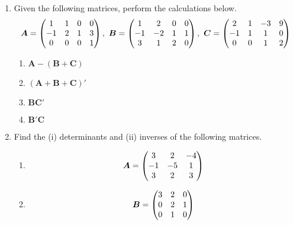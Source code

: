 \documentclass[pdflatex, letterpaper, 12pt]{scrartcl}
\begin{document}
\begin{enumerate}
\item Given the following matrices, perform the calculations below.
\begin{equation}
\bm{A} = \begin{pmatrix}
1 & 1 & 0 & 0 \\
-1 & 2 & 1 & 3 \\
0 & 0 & 0 & 1 \\
\end{pmatrix}, \ 
\bm{B} = \begin{pmatrix}
1 & 2 & 0 & 0 \\
-1 & -2 & 1 & 1 \\
3 & 1 & 2 & 0 \\
\end{pmatrix}, \ 
\bm{C} = \begin{pmatrix}
2 & 1 & -3 & 9 \\
-1 & 1 & 1 & 0 \\
0 & 0 & 1 & 2 \\
\end{pmatrix} \notag
\end{equation}
 \begin{enumerate}[label=(\alph*)]
 \item $\bm{A} - (\bm{B} + \bm{C})$
 \item $(\bm{A} + \bm{B} + \bm{C})'$
 \item $\bm{BC}'$
 \item $\bm{B}'\bm{C}$
 \end{enumerate}

\item Find the (i) determinants and (ii) inverses of the following matrices.
 \begin{enumerate}[label=(\alph*)]
 \item \begin{equation}
 \bm{A} = \begin{pmatrix}
 3 & 2 & -4 \\
 -1 & -5 & 1 \\
 3 & 2 & 3 \\
 \end{pmatrix} \notag
 \end{equation}
 \item \begin{equation}
 \bm{B} = \begin{pmatrix}
 3 & 2 & 0 \\
 0 & 2 & 1 \\
 0 & 1 & 0 \\
 \end{pmatrix} \notag
 \end{equation}
 \end{enumerate}


\end{enumerate}
\end{document}
